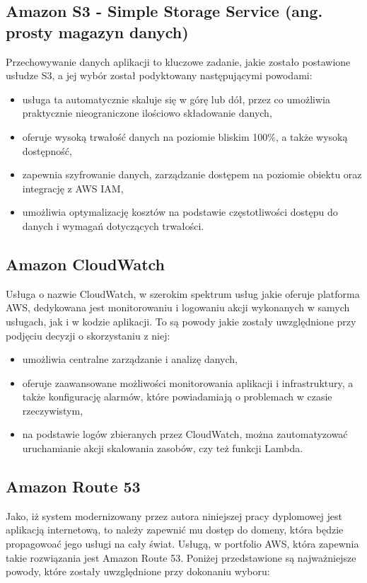 \documentclass[12pt,twoside]{book}
\begin{document}
    \subsection{Amazon S3 - Simple Storage Service (ang. prosty magazyn danych)}
    Przechowywanie danych aplikacji to kluczowe zadanie, jakie zostało postawione usłudze S3, a jej wybór został podyktowany następującymi powodami:

    \begin{itemize}
        \item usługa ta automatycznie skaluje się w górę lub dół, przez co umożliwia praktycznie nieograniczone ilościowo składowanie danych,
        \item oferuje wysoką trwałość danych na poziomie bliskim 100\%, a także wysoką dostępność,
        \item zapewnia szyfrowanie danych, zarządzanie dostępem na poziomie obiektu oraz integrację z AWS IAM,
        \item umożliwia optymalizację kosztów na podstawie częstotliwości dostępu do danych i wymagań dotyczących trwałości. \cite{aws.s3}
    \end{itemize}

    \subsection{Amazon CloudWatch}
    Usługa o nazwie CloudWatch, w szerokim spektrum usług jakie oferuje platforma AWS, dedykowana jest monitorowaniu i logowaniu akcji wykonanych w samych usługach, jak i w kodzie aplikacji. To są powody jakie zostały uwzględnione przy podjęciu decyzji o skorzystaniu z niej:

    \begin{itemize}
        \item umożliwia centralne zarządzanie i analizę danych,
        \item oferuje zaawansowane możliwości monitorowania aplikacji i infrastruktury, a także konfigurację alarmów, które powiadamiają o problemach w czasie rzeczywistym,
        \item na podstawie logów zbieranych przez CloudWatch, można zautomatyzować uruchamianie akcji skalowania zasobów, czy też funkcji Lambda. \cite{aws.cloud.watch}
    \end{itemize}

    \subsection{Amazon Route 53}
    Jako, iż system modernizowany przez autora niniejszej pracy dyplomowej jest aplikacją internetową, to należy zapewnić mu dostęp do domeny, która będzie propagowoać jego usługi na cały świat. Usługą, w portfolio AWS, która zapewnia takie rozwiązania jest Amazon Route 53. Poniżej przedstawione są najważniejsze powody, które zostały uwzględnione przy dokonaniu wyboru:
\end{document}

